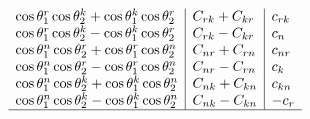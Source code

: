 \begin{refsection}
\begin{table}[htb]
\begin{center}
\begin{adjustbox}{scale=0.85,center}
\begin{math}
\begin{array}{l|l|l}
\cos \theta_1^r \cos \theta_2^k+\cos \theta_1^k \cos \theta_2^r & C_{r k}+C_{k r} & c_{r k} \\
\cos \theta_1^r \cos \theta_2^k-\cos \theta_1^k \cos \theta_2^r & C_{r k}-C_{k r} & c_n \\
\cos \theta_1^n \cos \theta_2^r+\cos \theta_1^r \cos \theta_2^n & C_{n r}+C_{r n} & c_{n r} \\
\cos \theta_1^n \cos \theta_2^r-\cos \theta_1^r \cos \theta_2^n & C_{n r}-C_{r n} & c_k \\
\cos \theta_1^n \cos \theta_2^k+\cos \theta_1^k \cos \theta_2^n & C_{n k}+C_{k n} & c_{k n} \\
\cos \theta_1^n \cos \theta_2^k-\cos \theta_1^k \cos \theta_2^n & C_{n k}-C_{k n} & -c_r \\
\hline 

\end{array}
\end{math}
\end{adjustbox}
\end{center}
\end{table}
\end{refsection}
